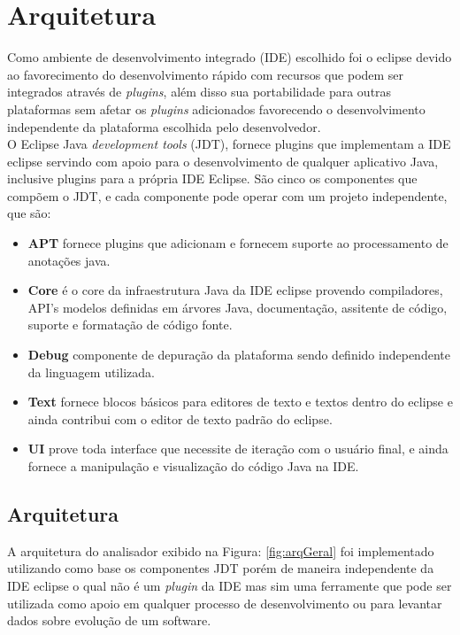 \chapter {Arquitetura}
Como ambiente de desenvolvimento integrado (IDE) escolhido foi o eclipse devido ao favorecimento do desenvolvimento rápido com recursos que podem ser integrados através de {\it plugins}, além disso sua portabilidade para outras plataformas sem afetar os {\it plugins} adicionados favorecendo o desenvolvimento independente da plataforma escolhida pelo desenvolvedor.\\

O Eclipse Java {\it development tools} (JDT), fornece plugins que implementam a IDE eclipse servindo com apoio para o desenvolvimento de qualquer aplicativo Java, inclusive plugins para a própria IDE Eclipse. São cinco os componentes que compõem o JDT, e cada componente pode operar com um projeto independente, que são:

	\begin{itemize}
		\item \textbf{APT} fornece plugins que adicionam e fornecem suporte ao processamento de anotações java.
		\item \textbf{Core} é o core da infraestrutura Java da IDE eclipse provendo compiladores, API's modelos definidas em árvores Java, documentação, assitente de código, suporte e formatação de código fonte.
		\item \textbf{Debug} componente de depuração da plataforma sendo definido independente da linguagem utilizada.
		\item \textbf{Text} fornece blocos básicos para editores de texto e textos dentro do eclipse e ainda contribui com o editor de texto padrão do eclipse. \item \textbf{UI} prove toda interface que necessite de iteração com o usuário final, e ainda fornece a manipulação e visualização do código Java na IDE.
	\end{itemize} 
	

	
\section {Arquitetura}

A arquitetura do analisador exibido na Figura: \ref{fig:arqGeral} foi  implementado utilizando como base os componentes \acs{JDT} porém de maneira independente da \acs{IDE} eclipse o qual não é um {\it plugin} da \acs{IDE} mas sim uma ferramente que pode ser utilizada como apoio em qualquer processo de desenvolvimento ou para levantar dados sobre evolução de um software.\\

